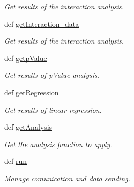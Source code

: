 \begin{DoxyCompactItemize}
\begin{DoxyCompactList}\small\item\em \-Get results of the interaction analysis. \end{DoxyCompactList}\item 
\hypertarget{classiRNA__stat_1_1Mpi_1_1Mpi_ae2e4c8f1ad6d438d0a8ec4576233efbc}{
def \hyperlink{classiRNA__stat_1_1Mpi_1_1Mpi_ae2e4c8f1ad6d438d0a8ec4576233efbc}{get\-Interaction\-\_\-data}}
\label{classiRNA__stat_1_1Mpi_1_1Mpi_ae2e4c8f1ad6d438d0a8ec4576233efbc}

\begin{DoxyCompactList}\small\item\em \-Get results of the interaction analysis. \end{DoxyCompactList}\item 
\hypertarget{classiRNA__stat_1_1Mpi_1_1Mpi_a0c69eb253d79f7a78f9e1df7f9d085cb}{
def \hyperlink{classiRNA__stat_1_1Mpi_1_1Mpi_a0c69eb253d79f7a78f9e1df7f9d085cb}{getp\-Value}}
\label{classiRNA__stat_1_1Mpi_1_1Mpi_a0c69eb253d79f7a78f9e1df7f9d085cb}

\begin{DoxyCompactList}\small\item\em \-Get results of p\-Value analysis. \end{DoxyCompactList}\item 
\hypertarget{classiRNA__stat_1_1Mpi_1_1Mpi_a8d693fa446d3a25bae1e29eece587d4c}{
def \hyperlink{classiRNA__stat_1_1Mpi_1_1Mpi_a8d693fa446d3a25bae1e29eece587d4c}{get\-Regression}}
\label{classiRNA__stat_1_1Mpi_1_1Mpi_a8d693fa446d3a25bae1e29eece587d4c}

\begin{DoxyCompactList}\small\item\em \-Get results of linear regression. \end{DoxyCompactList}\item 
\hypertarget{classiRNA__stat_1_1Mpi_1_1Mpi_a99466f44c421c03f4c253b19f3bc19cc}{
def \hyperlink{classiRNA__stat_1_1Mpi_1_1Mpi_a99466f44c421c03f4c253b19f3bc19cc}{get\-Analysis}}
\label{classiRNA__stat_1_1Mpi_1_1Mpi_a99466f44c421c03f4c253b19f3bc19cc}

\begin{DoxyCompactList}\small\item\em \-Get the analysis function to apply. \end{DoxyCompactList}\item 
def \hyperlink{classiRNA__stat_1_1Mpi_1_1Mpi_a1ff150809fcb2d512af9be3679de8424}{run}
\begin{DoxyCompactList}\small\item\em \-Manage comunication and data sending. \end{DoxyCompactList}\end{DoxyCompactItemize}
